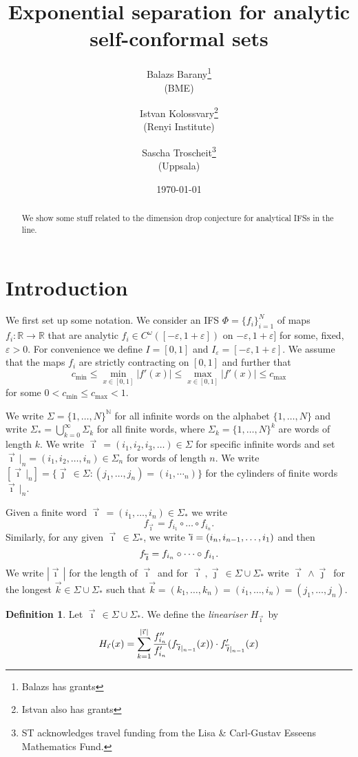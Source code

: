 \documentclass[12pt,]{article}
\title{Exponential separation for analytic self-conformal sets}
\author{Balazs Barany\footnote{Balazs has grants}\\(BME) \and Istvan Kolossvary\footnote{Istvan also
  has grants}\\ (Renyi Institute) \and Sascha
Troscheit\footnote{ST acknowledges travel funding from the Lisa \& Carl-Gustav Esseens Mathematics
Fund.} \\(Uppsala)}
\date{\today}
\theoremstyle{definition}
\newtheorem{definition}[theorem]{Definition}
\theoremstyle{remark}
\renewcommand{\Bbb}[1]{\mathbb{#1}}
\newcommand{\bbN}{{\Bbb N}}         %
\newcommand{\bbR}{{\Bbb R}}        %
\newcommand{\0}{\mathbf{0}}
\newcommand{\eps}{\varepsilon}
\newcommand{\cev}[1]{\reflectbox{\ensuremath{\vec{\reflectbox{\ensuremath{#1}}}}}}
\newcommand{\bi}{\vec{\imath}\,}
\newcommand{\bj}{\vec{\jmath}\,}
\newcommand{\bk}{{\vec{k}}}
\newcommand{\bbi}{\,\cev{\imath}}
\begin{document}
\frenchspacing
\maketitle

\begin{abstract}
  We show some stuff related to the dimension drop conjecture for analytical IFSs in the line.
\end{abstract}



%
%


\section{Introduction} \label{sec:intro}
We first set up some notation. We consider an IFS $\Phi=\{f_i\}_{i=1}^N$ of maps $f_i:\bbR\to\bbR$
that are analytic $f_i \in C^\omega([-\eps,1+\eps])$ on $-\eps,1+\eps]$ for some, fixed, $\eps>0$.
For convenience we define $I=[0,1]$ and $I_{\eps}=[-\eps,1+\eps]$.
We assume that the maps $f_i$ are strictly contracting on $[0,1]$ and further that 
\[
  c_{\min} \leq \min_{x\in[0,1]}
  |f'(x)| \leq \max_{x\in[0,1]}|f'(x)| \leq c_{\max} 
\]
for some $0<c_{\min} \leq c_{\max}<1$.

We write $\Sigma = \{1,\dots, N\}^{\bbN}$ for all infinite words on the alphabet $\{1,\dots,N\}$ and
write $\Sigma_* = \bigcup_{k=0}^\infty \Sigma_k$ for all finite words, where $\Sigma_k =
\{1,\dots,N\}^k$ are words of length $k$.
We write $\bi=(i_1,i_2,i_3,\dots) \in\Sigma$ for specific infinite words and set $\bi|_n =
(i_1,i_2,\dots,i_n)\in \Sigma_n$ for words of length $n$. We write $[\bi|_n] = \{\bj\in\Sigma :
(j_1,\dots,j_n) = (i_1,\dotsi_n)\}$ for the cylinders of finite words $\bi|_n$. 

Given a finite word $\bi=(i_1,\dots,i_n)\in\Sigma_*$ we write
\[
  f_{\bi} = f_{i_1}\circ \dots \circ f_{i_n}.
\]
Similarly, for any given $\bi\in\Sigma_*$, we write $\bbi = (i_n,i_{n-1},\dots, i_1)$ and then
\[
  f_{\bbi} = f_{i_n}\circ \dots \circ f_{i_1}.
\]
We write $|\bi|$ for the length of $\bi$ and for $\bi,\bj\in\Sigma\cup\Sigma_*$ write $\bi\wedge\bj$
for the longest $\bk\in\Sigma\cup\Sigma_*$ such that $\bk=(k_1,\dots, k_n) = (i_1,\dots,
i_n)=(j_1,\dots,j_n)$.

\begin{definition}
  Let $\bi\in \Sigma\cup\Sigma_*$. We define the \emph{lineariser} $H_{\bi}$ by
  \[
    H_{\bi}(x) = \sum_{k=1}^{|\bi|}
  \frac{f''_{i_n}}{f'_{i_n}}(f_{\bbi|_{n-1}}(x))\cdot f'_{\bbi|_{n-1}}(x)
  \]
\end{definition}
\end{document}
